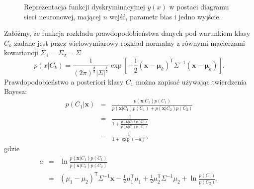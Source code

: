 \documentclass[11pt]{book}
\theoremstyle{definition}
\begin{document}
\begin{SCfigure}
	\centering
	
	\caption{ Reprezentacja funkcji dyskryminacyjnej $y(x)$ w postaci diagramu sieci neuronowej, mającej $n$ wejść, parametr bias i jedno wyjście.  }
\end{SCfigure}
%
Załóżmy, że funkcja rozkładu prawdopodobieństwa danych pod warunkiem klasy $C_k$ zadane jest przez wielowymiarowy rozkład normalny z równymi macierzami kowariancji $ \Sigma_1 = \Sigma_2 = \Sigma$
%
\begin{equation}
p(x|C_k) = \frac{1}{\left(2 \pi\right)^{\frac{d}{2}} \left| \Sigma \right|^{\frac{1}{2}}} \exp \left[ -\frac{1}{2} \left(\mathbf{x} - \mathbf{\mu}_k\right)^\mathsf{T} \Sigma^{-1} \left(\mathbf{x} - \mathbf{\mu}_k \right) \right].
\end{equation}
%
Prawdopodobieństwo a posteriori klasy $C_1$ można zapisać używając twierdzenia Bayesa:
%
\begin{eqnarray}
p(C_1 | \mathbf{x}) &=& \frac{p(\mathbf{x}|C_1) p(C_1)}{ p(\mathbf{x}|C_1) p(C_1) + p(\mathbf{x}|C_2)p(C_2)} \nonumber\\
&=& \frac{1}{1 + \frac{p(\mathbf{x}|C_2)p(C_2)}{p(\mathbf{x}|C_1)p(C_1)}} \nonumber\\ 
&=& \frac{1}{1 + \exp(-a)},
\end{eqnarray}
%
gdzie
%
\begin{eqnarray}
a &=& \ln \frac{p(\mathbf{x}|C_1)p(C_1)}{p(\mathbf{x}|C_2)p(C_2)} \nonumber \\
&=& \left( \mu_1 - \mu_2 \right)^{\mathsf{T}} \Sigma^{-1} \mathbf{x}  - \frac{1}{2} \mu_1^\mathsf{T}\mu_1 + \frac{1}{2} \mu_2^\mathsf{T} \Sigma^{-1} \mu_2 + \ln \frac{p(C_1)}{p(C_2)},
\end{eqnarray}
\end{document}
